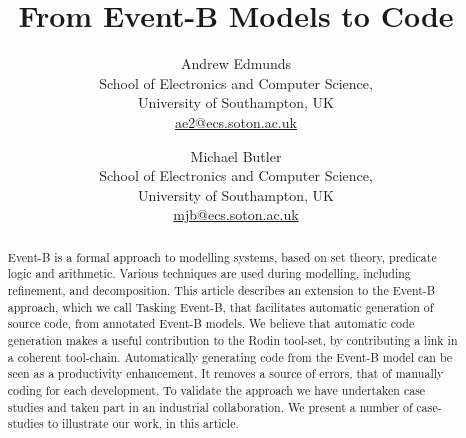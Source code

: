 \documentclass{easychair}
\begin{document}
%
\title{From Event-B Models to Code}

%


%

\author{Andrew Edmunds\\
School of Electronics and Computer Science,\\
University of Southampton, UK\\
\url{ae2@ecs.soton.ac.uk}\\
\and
Michael Butler\\
School of Electronics and Computer Science,\\
University of Southampton, UK\\
\url{mjb@ecs.soton.ac.uk}\\
}

%


\maketitle

%
\begin{abstract}
Event-B is a formal approach to modelling systems, based on set theory, predicate logic and arithmetic. Various techniques are used during modelling, including refinement, and decomposition. This article describes an extension to the Event-B approach, which we call Tasking Event-B, that facilitates automatic generation of source code, from annotated Event-B models. We believe that automatic code generation makes a useful contribution to the Rodin tool-set, by contributing a link in a coherent tool-chain. Automatically generating code from the Event-B model can be seen as a productivity enhancement. It removes a source of errors, that of manually coding for each development. To validate the approach we have undertaken case studies and taken part in an industrial collaboration. We present a number of case-studies to illustrate our work, in this article.
\end{abstract}
\end{document}
